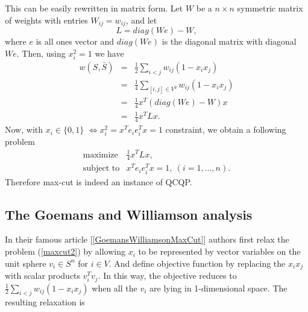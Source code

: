 \documentclass[12pt]{book}
\theoremstyle{definition}
\begin{document}
This can be easily rewritten in matrix form. Let $W$ be a $n\times n$ symmetric matrix of weights with entries $W_{ij} = w_{ij}$, and let
\begin{equation}
\label{LaplacianMatrix}
L = diag(We) - W,
\end{equation}
 where $e$ is all ones vector and $diag(We)$ is the diagonal matrix with diagonal $We$.
Then, using $x_i^2 = 1$ we have
\begin{eqnarray}
w(S,\bar{S}) & = & \frac{1}{2}\sum_{i<j}w_{ij}(1-x_ix_j )  \\
			 & = & \frac{1}{4}\sum_{[i,j]\in V^2}w_{ij}(1-x_ix_j ) \\
			 & = & \frac{1}{4}x^T(diag(We) - W)x  \\
			 & = & \frac{1}{4}x^TLx.
\end{eqnarray}
Now, with $x_i \in \{0,1\}$ $\Leftrightarrow x_i^2 = x^Te_ie_i^Tx = 1$ constraint, we obtain a following problem
\begin{equation}
\label{maxcut3}
\begin{array}{ll}
\mbox{maximize} & \frac{1}{4}x^TLx, \\
\mbox{subject to} &  x^Te_ie_i^Tx = 1, \  (i = 1,\dots ,n).
\end{array}
\end{equation}
Therefore max-cut is indeed an instance of QCQP.


\subsection{The Goemans and Williamson analysis}

In their famous article [\ref{GoemansWilliamsonMaxCut}] authors first relax the problem (\ref{maxcut2})
by allowing $x_i$ to be represented by vector variables on the unit sphere $v_i\in S^n$ for $i\in V$. 
And define objective function by replacing the $x_ix_j$ with scalar products $v_i^Tv_j$.
In this way, the objective reduces to $ \frac{1}{2}\sum_{i<j}w_{ij}(1-x_ix_j )$ when all the $v_i$ are lying in 1-dimensional space.
The resulting relaxation is 
 
\end{document}
